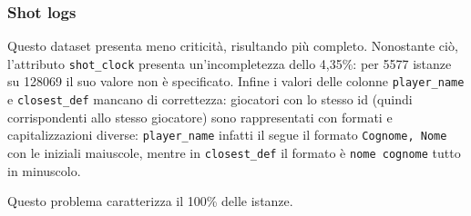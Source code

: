 \subsubsection{Shot logs}

Questo dataset presenta meno criticità, risultando più completo. Nonostante ciò, l’attributo \texttt{shot\_clock} presenta un’incompletezza dello 4,35\%: per 5577 istanze su 128069 il suo valore non è specificato.
Infine i valori delle colonne \texttt{player\_name} e \texttt{closest\_def} mancano di correttezza: giocatori con lo stesso id (quindi corrispondenti allo stesso giocatore) sono rappresentati con formati e capitalizzazioni diverse: \texttt{player\_name} infatti il segue il formato \texttt{Cognome, Nome} con le iniziali maiuscole, mentre in \texttt{closest\_def} il formato è \texttt{nome cognome} tutto in minuscolo.
\par
Questo problema caratterizza il 100\% delle istanze.
